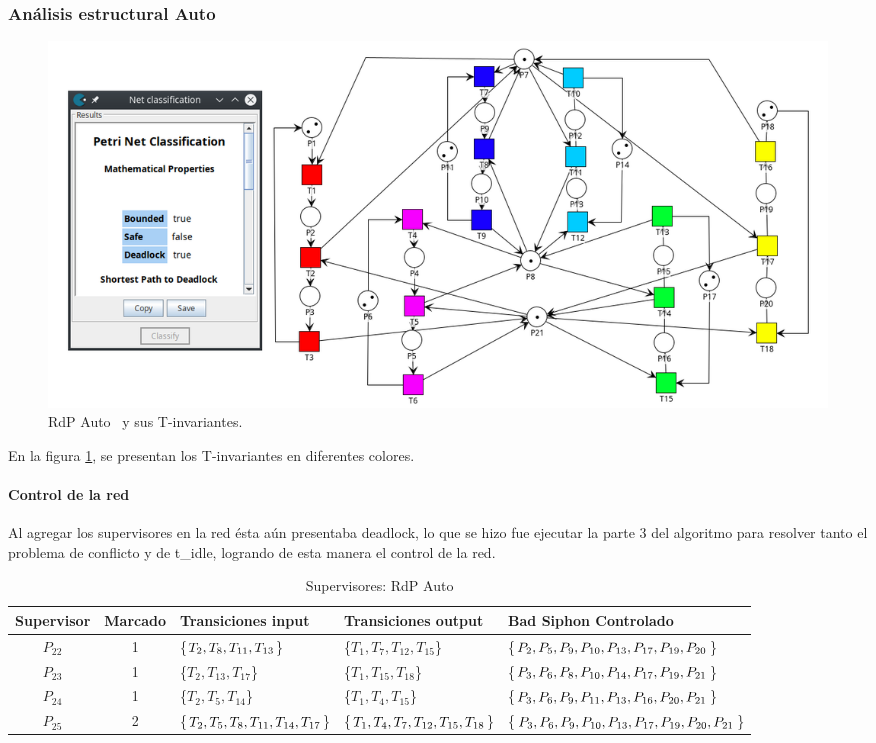 \subsubsection{Análisis estructural Auto}
\hfill
\begin{figure} [H]
	\centering
	\includegraphics[width=\textwidth]{Figures/testing/auto-t-inv.png}
	\caption[RdP Auto y sus T-invariantes.]{RdP Auto \footnotemark \ y sus T-invariantes.}
	\label{fig:amsinvariantes}
 \end{figure} 

En la figura \ref{fig:amsinvariantes}, se presentan los T-invariantes en diferentes colores. 

\paragraph{Control de la red}
\hfill \break
Al agregar los supervisores en la red ésta aún presentaba deadlock, lo que se hizo fue ejecutar la parte 3 del algoritmo para resolver tanto el problema de conflicto y de t\_idle, logrando de esta manera el control de la red.

\bigskip 
\begin{table}[H]
    \small
    \centering
    \begin{tabular}{|c|c|P{2cm}|P{2.3cm}|P{4.25cm}|}
    \hline
    \textbf{Supervisor} & \textbf{Marcado} & \textbf{Transiciones input} & \textbf{Transiciones output} & \textbf{Bad Siphon Controlado}  \\  \hline
    $P_{22}$ & 1 & \{$T_{2},T_{8},T_{11}, \break T_{13}$\} & \{$T_{1},T_{7},T_{12},T_{15}$\} & \{$P_2, P_5, P_9, P_{10}, P_{13}, P_{17}, \break P_{19}, P_{20}$\} \\ 
    \hline
    $P_{23}$ & 1 & \{$T_{2},T_{13},T_{17}$\} & \{$T_{1},T_{15},T_{18}$\} & \{$P_3, P_6, P_8, P_{10}, P_{14}, P_{17}, \break P_{19}, P_{21}$\} \\ 
    \hline
    $P_{24}$ & 1 & \{$T_{2},T_{5},T_{14}$\} & \{$T_{1},T_{4},T_{15}$\} & \{$P_3, P_6, P_9, P_{11}, P_{13}, P_{16}, \break P_{20}, P_{21}$\} \\ 
    \hline
    $P_{25}$ & 2 & \{$T_{2},T_{5},T_{8}, \break T_{11},T_{14},T_{17}$\} & \{$T_{1},T_{4},T_{7},T_{12}, \break T_{15},T_{18}$\} & \{$P_3, P_6, P_9, P_{10}, P_{13}, P_{17}, \break P_{19}, P_{20}, P_{21}$\} \\
    \hline
    \end{tabular}
    \caption{Supervisores: RdP Auto}
    \label{tab:AMS12-v4}
\end{table}
\hfill

